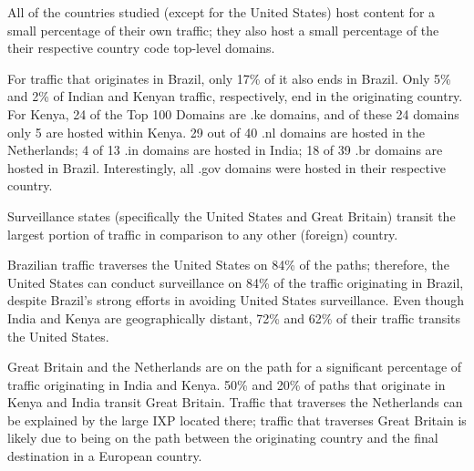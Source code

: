

\begin{finding}
All of the countries studied (except for the United States) host content for a small percentage of their own traffic; they also host a small percentage of the their respective country code top-level domains.
\end{finding}
For traffic that originates in Brazil, only 17\% of it also ends in Brazil.  Only 5\% and 2\% of Indian and Kenyan traffic, respectively, end in the originating country. 
For Kenya, 24 of the Top 100 Domains are .ke domains, and of these 24 domains only 5 are hosted within Kenya.  29 out of 40 .nl domains are hosted in the Netherlands; 4 of 13 .in domains are hosted in India; 18 of 39 .br domains are hosted in Brazil.  Interestingly, all .gov domains were hosted in their respective country. 

\begin{finding}
Surveillance states (specifically the United States and Great Britain) transit the largest portion of traffic in comparison to any other (foreign) country.
\end{finding}
Brazilian traffic traverses the United States on 84\% of the paths; therefore, the United States can conduct surveillance on 84\% of the traffic originating in Brazil, despite Brazil's strong efforts in avoiding United States surveillance.  Even though India and Kenya are geographically distant, 72\% and 62\% of their traffic transits the United States.   

Great Britain and the Netherlands are on the path for a significant percentage of traffic originating in India and Kenya.  50\% and 20\% of paths that originate in Kenya and India transit Great Britain.  Traffic that traverses the Netherlands can be explained by the large IXP located there; traffic that traverses Great Britain is likely due to being on the path between the originating country and the final destination in a European country.

